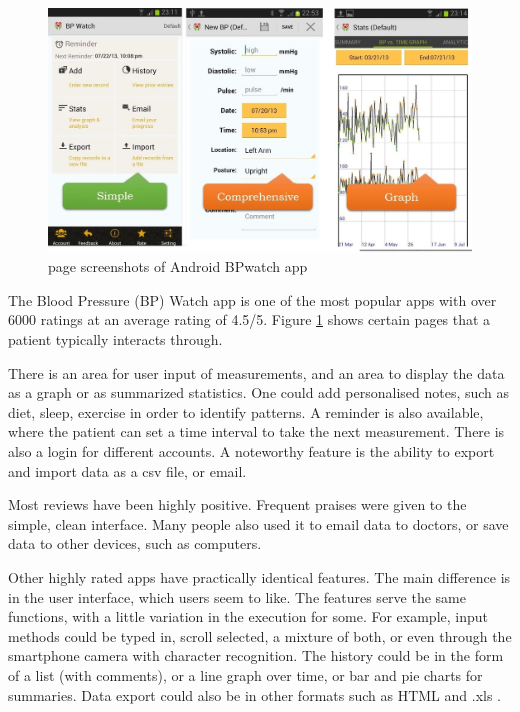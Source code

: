 \documentclass[11pt]{article}
\begin{document}
\begin{figure}[ht]
\begin{center}
\includegraphics[scale=0.4]{BPwatch}
\caption{page screenshots of Android BPwatch app}
\label{fig:BPwatch}
\end{center}
\end{figure}

The Blood Pressure (BP) Watch app \cite{app1} is one of the most popular apps with over 6000 ratings at an average rating of 4.5/5.  Figure \ref{fig:BPwatch} shows certain pages that a patient typically interacts through.

There is an area for user input of measurements, and an area to display the data as a graph or as summarized statistics.  One could add personalised notes, such as diet, sleep, exercise in order to identify patterns. A reminder is also available, where the patient can set a time interval to take the next measurement.  There is also a login for different accounts.  A noteworthy feature is the ability to export and import data as a csv file, or email. 

Most reviews have been highly positive. Frequent praises were given to the simple, clean interface.  Many people also used it to email data to doctors, or save data to other devices, such as computers.

Other highly rated apps\cite{UIiBP}\cite{UIbppp}\cite{UIbpmh}\cite{UIbpd} have practically identical features. The main difference is in the user interface, which users seem to like.  The features serve the same functions, with a little variation in the execution for some.  For example, input methods could be typed in, scroll selected, a mixture of both, or even through the smartphone camera with character recognition\cite{UIbpd}.  The history could be in the form of a list (with comments), or a line graph over time, or bar and pie charts for summaries. Data export could also be in other formats such as HTML and .xls .  
\end{document}
